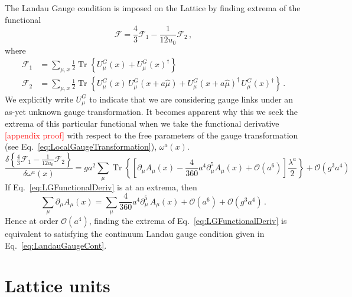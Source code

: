 The Landau Gauge condition is imposed on the Lattice by finding extrema of the functional~\cite{Bonnet:1999mj}
%
\begin{equation}
\mathcal{F} =  \frac{4}{3}\mathcal{F}_1 - \frac{1}{12u_0}\mathcal{F}_2\, ,
\label{eq:LGFunctional}
\end{equation}
%
where
%
\begin{align*}
\mathcal{F}_1 &= \sum _ { \mu , x } \frac { 1 } { 2 } \operatorname { Tr } \left\{ U _ { \mu } ^ { G } ( x ) + U _ { \mu } ^ { G } ( x ) ^ { \dagger } \right\}\\
\mathcal{F}_2 &= \sum _ { \mu , x } \frac { 1 } { 2 } \operatorname { Tr } \left\{ U _ { \mu } ^ { G } ( x ) \,U _ { \mu } ^ { G } ( x + a\hat { \mu } ) + U _ { \mu } ^ { G } ( x + a\hat { \mu } )^\dagger\, U _ { \mu } ^ { G } ( x )^\dagger  \right\}\, .
\end{align*}
%
We explicitly write $U^G_\mu$ to indicate that we are considering gauge links under an as-yet unknown gauge transformation. It becomes apparent why this we seek the extrema of this particular functional when we take the functional derivative \textcolor{red}{[appendix proof]} with respect to the free parameters of the gauge transformation (see Eq.~\ref{eq:LocalGaugeTransformation}), $\omega^a(x)$.
%
\begin{equation}
\frac { \delta \left\{ \frac { 4 } { 3 } \mathcal { F } _ { 1 } - \frac { 1 } { 12 u _ { 0 } } \mathcal { F } _ { 2 } \right\} } { \delta \omega ^ { a } ( x ) } = g a ^ { 2 } \sum _ { \mu } \operatorname { Tr } \left\{ \left[ \partial _ { \mu } A _ { \mu } ( x ) - \frac { 4 } { 360 } a ^ { 4 } \partial _ { \mu } ^ { 5 } A _ { \mu } ( x ) + \mathcal { O } \left( a ^ { 6 } \right) \right] \frac{\lambda^a}{2} \right\} + \mathcal { O } \left( g ^ { 3 } a ^ { 4 } \right)
\label{eq:LGFunctionalDeriv}
\end{equation}
%
If Eq.~\ref{eq:LGFunctionalDeriv} is at an extrema, then 
%
\begin{equation*}
\sum_\mu \partial_\mu A_\mu(x) = \sum_\mu \frac{4}{360}a^4 \partial_\mu^5\,A_\mu(x) + \mathcal{O}(a^6)+\mathcal{O}(g^3a^4)\, .
\end{equation*}
%
Hence at order $\mathcal{O}(a^4)$, finding the extrema of Eq.~\ref{eq:LGFunctionalDeriv} is equivalent to satisfying the continuum Landau gauge condition given in Eq.~\ref{eq:LandauGaugeCont}.

\section{Lattice units}

